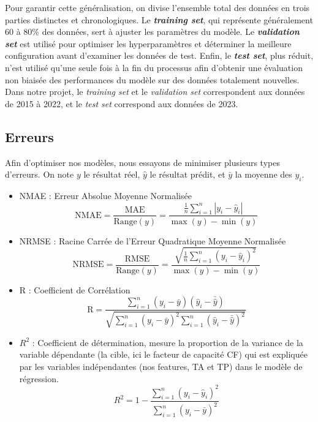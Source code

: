 \documentclass{article}
\theoremstyle{nopointbreak}
\theoremstyle{nobrkbold}
\begin{document}
Pour garantir cette généralisation, on divise l'ensemble total des données en trois parties distinctes et chronologiques.
Le \textbf{\textit{training set}}, qui représente généralement 60 à 80\% des données, sert à ajuster les paramètres du modèle. Le \textbf{\textit{validation set}} est utilisé pour optimiser les hyperparamètres et déterminer la meilleure configuration avant d’examiner les données de test. Enfin, le \textbf{\textit{test set}}, plus réduit, n’est utilisé qu’une seule fois à la fin du processus afin d’obtenir une évaluation non biaisée des performances du modèle sur des données totalement nouvelles.\\

Dans notre projet, le \textit{training set} et le \textit{validation set }correspondent aux données de 2015 à 2022, et le \textit{test set} correspond aux données de 2023.


\subsection{Erreurs}
Afin d'optimiser nos modèles, nous essayons de minimiser plusieurs types d'erreurs. On note $y$ le résultat réel, $\hat{y}$ le résultat prédit, et $\bar{y}$ la moyenne des $y_i$.

\begin{itemize}

    \item NMAE : Erreur Absolue Moyenne Normalisée
$$ \text{NMAE} = \frac{\text{MAE}}{\text{Range}(y)} = \frac{\frac{1}{n} \sum_{i=1}^{n} |y_i - \hat{y}_i|}{\max(y) - \min(y)} $$

    \item NRMSE : Racine Carrée de l'Erreur Quadratique Moyenne Normalisée
    $$ \text{NRMSE} = \frac{\text{RMSE}}{\text{Range}(y)} = \frac{\sqrt{\frac{1}{n} \sum_{i=1}^{n} (y_i - \hat{y}_i)^2}}{\max(y) - \min(y)} $$

    \item R : Coefficient de Corrélation
$$ \text{R} = \frac{\sum_{i=1}^{n} (y_i - \bar{y})(\hat{y}_i - \bar{\hat{y}})}{\sqrt{\sum_{i=1}^{n} (y_i - \bar{y})^2 \sum_{i=1}^{n} (\hat{y}_i - \bar{\hat{y}})^2}} $$


    \item $R^2$ : Coefficient de détermination, mesure la proportion de la variance de la variable dépendante (la cible, ici le facteur de capacité CF) qui est expliquée par les variables indépendantes (nos features, TA et TP) dans le modèle de régression.
$$R^2 = 1 - \frac{\sum_{i=1}^{n} (y_i - \hat{y}_i)^2}{\sum_{i=1}^{n} (y_i - \bar{y})^2}$$

\end{itemize}
\end{document}
